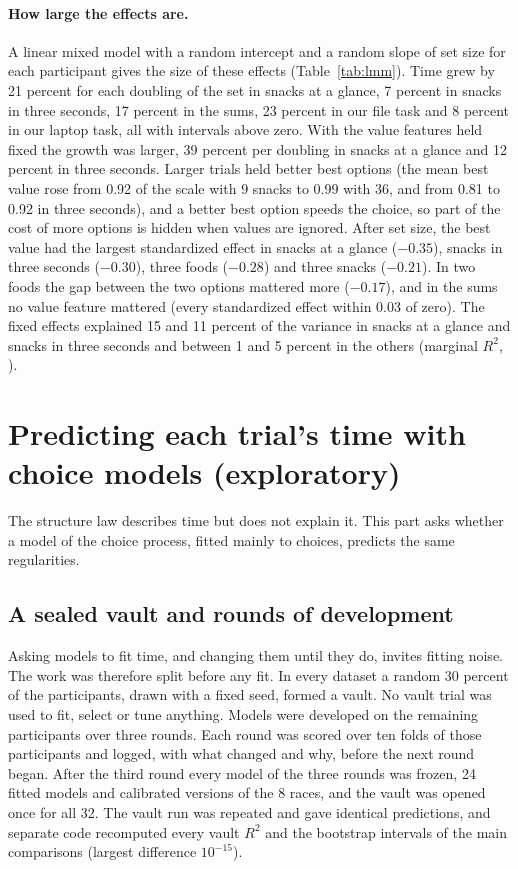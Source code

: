 \documentclass[11pt]{article}
\newcommand{\Rtwo}{R^2}
\begin{document}
\paragraph{How large the effects are.} A linear mixed model with a random intercept and a random slope of set size for each participant gives the size of these effects (Table~\ref{tab:lmm}). Time grew by 21 percent for each doubling of the set in snacks at a glance, 7 percent in snacks in three seconds, 17 percent in the sums, 23 percent in our file task and 8 percent in our laptop task, all with intervals above zero. With the value features held fixed the growth was larger, 39 percent per doubling in snacks at a glance and 12 percent in three seconds. Larger trials held better best options (the mean best value rose from 0.92 of the scale with 9 snacks to 0.99 with 36, and from 0.81 to 0.92 in three seconds), and a better best option speeds the choice, so part of the cost of more options is hidden when values are ignored. After set size, the best value had the largest standardized effect in snacks at a glance ($-0.35$), snacks in three seconds ($-0.30$), three foods ($-0.28$) and three snacks ($-0.21$). In two foods the gap between the two options mattered more ($-0.17$), and in the sums no value feature mattered (every standardized effect within 0.03 of zero). The fixed effects explained 15 and 11 percent of the variance in snacks at a glance and snacks in three seconds and between 1 and 5 percent in the others (marginal $\Rtwo$, \citealp{nakagawa2013}).

\section{Predicting each trial's time with choice models (exploratory)}
\label{sec:models}

The structure law describes time but does not explain it. This part asks whether a model of the choice process, fitted mainly to choices, predicts the same regularities.

\subsection{A sealed vault and rounds of development}

Asking models to fit time, and changing them until they do, invites fitting noise. The work was therefore split before any fit. In every dataset a random 30 percent of the participants, drawn with a fixed seed, formed a vault. No vault trial was used to fit, select or tune anything. Models were developed on the remaining participants over three rounds. Each round was scored over ten folds of those participants and logged, with what changed and why, before the next round began. After the third round every model of the three rounds was frozen, 24 fitted models and calibrated versions of the 8 races, and the vault was opened once for all 32. The vault run was repeated and gave identical predictions, and separate code recomputed every vault $\Rtwo$ and the bootstrap intervals of the main comparisons (largest difference $10^{-15}$).
\end{document}
